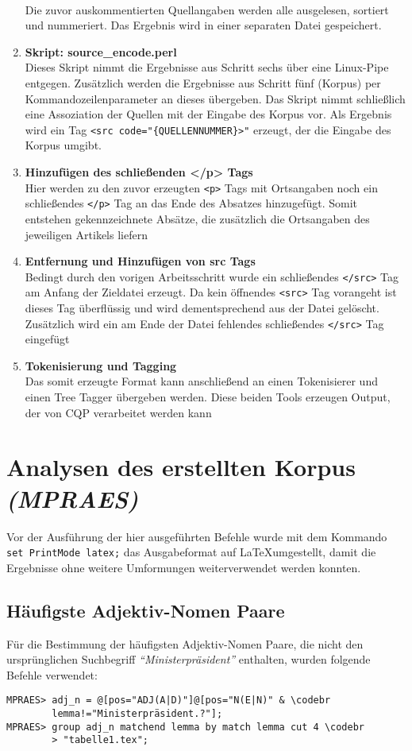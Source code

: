 \documentclass[%
	type=document,%
  	style=article,%
  	media=print,
  	pages=oneside,%
  	prefixLecturer=Dozenten:,
  	author=multiple,
]{unihildesheim} %
\newcommand{\codebr}{\textbf{\rotatebox[origin=c]{180}{$\Rsh$}}}
\begin{document}
\begin{enumerate}
  \\ Die zuvor auskommentierten Quellangaben werden alle ausgelesen, sortiert
  und nummeriert. Das Ergebnis wird in einer separaten Datei gespeichert.
  \item \textbf{Skript: source\_encode.perl}
  \\Dieses Skript nimmt die Ergebnisse aus Schritt sechs über eine Linux-Pipe
  entgegen. Zusätzlich werden die Ergebnisse aus Schritt fünf (Korpus) per
  Kommandozeilenparameter an dieses übergeben. Das Skript nimmt schließlich eine
  Assoziation der Quellen mit der Eingabe des Korpus vor. Als Ergebnis wird ein
  Tag \texttt{<src code="\{QUELLENNUMMER\}>"} erzeugt, der die Eingabe des
  Korpus umgibt.
  \item \textbf{Hinzufügen des schließenden </p> Tags}
  \\ Hier werden zu den zuvor erzeugten \texttt{<p>} Tags mit Ortsangaben noch
  ein schließendes \texttt{</p>} Tag an das Ende des Absatzes hinzugefügt. Somit
  entstehen gekennzeichnete Absätze, die zusätzlich die Ortsangaben des jeweiligen
  Artikels liefern
  \item \textbf{Entfernung und Hinzufügen von src Tags}
  \\ Bedingt durch den vorigen Arbeitsschritt wurde ein schließendes
  \texttt{</src>} Tag am Anfang der Zieldatei erzeugt. Da kein öffnendes
  \texttt{<src>} Tag vorangeht ist dieses Tag überflüssig und wird
  dementsprechend aus der Datei gelöscht.
  Zusätzlich wird ein am Ende der Datei fehlendes schließendes \texttt{</src>}
  Tag eingefügt
  \item \textbf{Tokenisierung und Tagging}
  \\ Das somit erzeugte Format kann anschließend an einen Tokenisierer und einen
  Tree Tagger übergeben werden. Diese beiden Tools erzeugen Output, der von CQP
  verarbeitet werden kann
\end{enumerate}

\section{Analysen des erstellten Korpus \textit{(MPRAES)}}
Vor der Ausführung der hier ausgeführten Befehle wurde mit dem Kommando
\texttt{set PrintMode latex;} das Ausgabeformat auf \LaTeX umgestellt, damit die
Ergebnisse ohne weitere Umformungen weiterverwendet werden konnten.


\subsection{Häufigste Adjektiv-Nomen Paare}
Für die Bestimmung der häufigsten Adjektiv-Nomen Paare, die nicht den
ursprünglichen Suchbegriff \textit{"`Ministerpräsident"'} enthalten, wurden
folgende Befehle verwendet:
\begin{Verbatim}[frame=single,label=CQP,commandchars=\\\{\}]
MPRAES> adj_n = @[pos="ADJ(A|D)"]@[pos="N(E|N)" & \codebr
        lemma!="Ministerpräsident.?"];
MPRAES> group adj_n matchend lemma by match lemma cut 4 \codebr
        > "tabelle1.tex";
\end{Verbatim}
\end{document}
